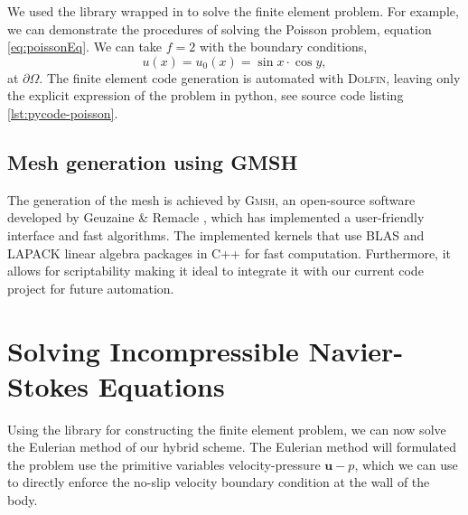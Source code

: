 We used the \dolfin library wrapped in \python to solve the finite element problem. For example, we can demonstrate the procedures of solving the Poisson problem, equation \ref{eq:poissonEq}. We can take $f=2$ with the boundary conditions,
	\begin{equation}
	u(x) = u_0(x) = \sin x \cdot \cos y,
	\end{equation}
at $\partial \Omega$. The finite element code generation is automated with \textsc{Dolfin}, leaving only the explicit expression of the problem in python, see source code listing \ref{lst:pycode-poisson}.

\subsection{Mesh generation using GMSH}

The generation of the mesh is achieved by \textsc{Gmsh}, an open-source software developed by Geuzaine \& Remacle \cite{Geuzaine2009b}, which has implemented a user-friendly interface and fast algorithms. The \gmsh implemented kernels that use \textsc{BLAS} and LAPACK linear algebra packages in C++ for fast computation. Furthermore, it allows for scriptability making it ideal to integrate it with our current \python code project for future automation.

\section{Solving Incompressible Navier-Stokes Equations}
Using the \dolfin library for constructing the finite element problem, we can now solve the Eulerian method of our hybrid scheme. The Eulerian method will formulated the problem use the primitive variables velocity-pressure $\mathbf{u}-p$, which we can use to directly enforce the no-slip velocity boundary condition at the wall of the body. 


